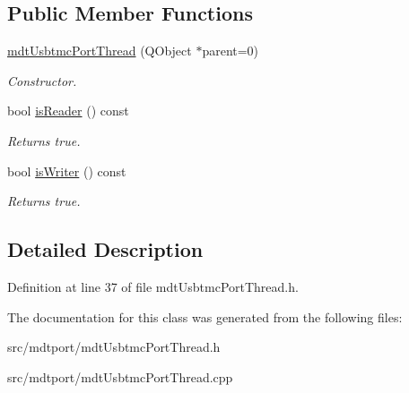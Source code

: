\subsection*{Public Member Functions}
\begin{DoxyCompactItemize}
\item 
\hypertarget{classmdt_usbtmc_port_thread_afc02cdf1c178b56ff42fdf997df1014c}{
\hyperlink{classmdt_usbtmc_port_thread_afc02cdf1c178b56ff42fdf997df1014c}{mdtUsbtmcPortThread} (QObject $\ast$parent=0)}
\label{classmdt_usbtmc_port_thread_afc02cdf1c178b56ff42fdf997df1014c}

\begin{DoxyCompactList}\small\item\em Constructor. \end{DoxyCompactList}\item 
\hypertarget{classmdt_usbtmc_port_thread_a27c115427b49d5ae988c9f9c9a5e402a}{
bool \hyperlink{classmdt_usbtmc_port_thread_a27c115427b49d5ae988c9f9c9a5e402a}{isReader} () const }
\label{classmdt_usbtmc_port_thread_a27c115427b49d5ae988c9f9c9a5e402a}

\begin{DoxyCompactList}\small\item\em Returns true. \end{DoxyCompactList}\item 
\hypertarget{classmdt_usbtmc_port_thread_a4c58b7140f0483a19723b14487907423}{
bool \hyperlink{classmdt_usbtmc_port_thread_a4c58b7140f0483a19723b14487907423}{isWriter} () const }
\label{classmdt_usbtmc_port_thread_a4c58b7140f0483a19723b14487907423}

\begin{DoxyCompactList}\small\item\em Returns true. \end{DoxyCompactList}\end{DoxyCompactItemize}


\subsection{Detailed Description}


Definition at line 37 of file mdtUsbtmcPortThread.h.



The documentation for this class was generated from the following files:\begin{DoxyCompactItemize}
\item 
src/mdtport/mdtUsbtmcPortThread.h\item 
src/mdtport/mdtUsbtmcPortThread.cpp\end{DoxyCompactItemize}
